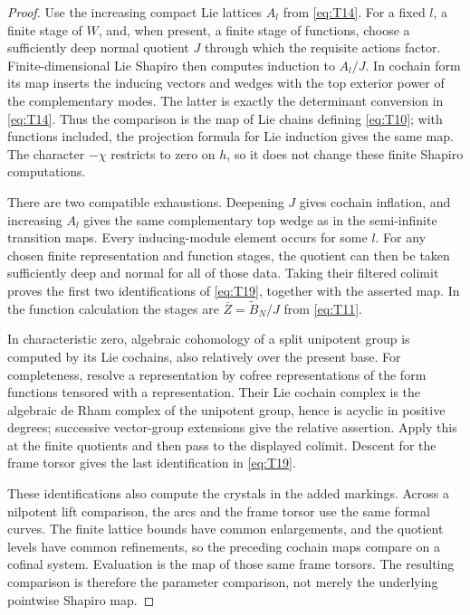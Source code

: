 \begin{proof}
Use the increasing compact Lie lattices $A_l$ from \eqref{eq:T14}.
For a fixed $l$, a finite stage of $W$, and, when present, a finite stage
of functions, choose a sufficiently deep normal quotient $J$ through
which the requisite actions factor.  Finite-dimensional Lie Shapiro then
computes induction to $A_l/J$.  In cochain form its map inserts the
inducing vectors and wedges with the top exterior power of the
complementary modes.  The latter is exactly the determinant conversion
in \eqref{eq:T14}.  Thus the comparison is the map of Lie chains defining
\eqref{eq:T10}; with functions included, the projection formula for Lie
induction gives the same map.  The character $-\chi$ restricts to zero on
$h$, so it does not change these finite Shapiro computations.

There are two compatible exhaustions.  Deepening $J$ gives cochain
inflation, and increasing $A_l$ gives the same complementary top wedge as
in the semi-infinite transition maps.  Every inducing-module element
occurs for some $l$.  For any chosen finite representation and function
stages, the quotient can then be taken sufficiently deep and normal for
all of those data.  Taking their filtered colimit proves the first two
identifications of \eqref{eq:T19}, together with the asserted map.  In
the function calculation the stages are
$\overline Z=\widetilde B_N/J$ from \eqref{eq:T11}.

In characteristic zero, algebraic cohomology of a split unipotent group
is computed by its Lie cochains, also relatively over the present base.
For completeness, resolve a representation by cofree representations of
the form functions tensored with a representation.  Their Lie cochain
complex is the algebraic de Rham complex of the unipotent group, hence is
acyclic in positive degrees; successive vector-group extensions give
the relative assertion.  Apply this at the finite quotients and then
pass to the displayed colimit.  Descent for the frame torsor gives the
last identification in \eqref{eq:T19}.

These identifications also compute the crystals in the added markings.
Across a nilpotent lift comparison, the arcs and the frame torsor use the
same formal curves.  The finite lattice bounds have common enlargements,
and the quotient levels have common refinements, so the preceding
cochain maps compare on a cofinal system.  Evaluation is the map of those
same frame torsors.  The resulting comparison is therefore the
parameter comparison, not merely the underlying pointwise Shapiro map.
\end{proof}


